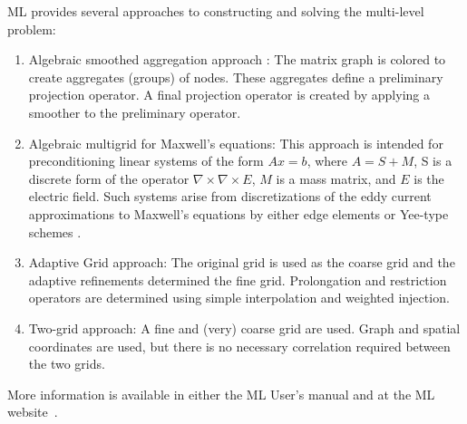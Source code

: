 \documentclass[12pt,relax]{TPA}
\begin{document}
ML provides several approaches to constructing and solving the multi-level
problem:
\begin{enumerate}
\item Algebraic smoothed aggregation approach \cite{Vanek:96,Vanek:98}:  The
 matrix graph is colored to create aggregates (groups) of nodes.
These aggregates define a preliminary projection operator.
A final projection operator is created by applying a smoother to the
 preliminary operator.
%
\item Algebraic multigrid for Maxwell's equations:
 This approach is
intended for preconditioning linear systems of the form $Ax=b$, where $A=S+M$,
S is a discrete form of the operator $\nabla\times\nabla\times E$,
 $M$ is a mass matrix, and $E$ is the electric field.
Such systems arise from discretizations of the eddy current approximations to
Maxwell's equations by either edge elements or Yee-type schemes
\cite{Bochev:03a,Yee:66}.


%
\item Adaptive Grid approach: The original grid is used as the coarse grid and
the adaptive refinements determined the fine grid.
Prolongation and restriction operators are determined using simple interpolation
and weighted injection.
%
\item Two-grid approach: A fine and (very) coarse grid are used.
Graph and spatial coordinates are used, 
but there is no necessary correlation required between the two grids.
\end{enumerate}

%
More information is available in either the ML User's manual
\cite{TuminaroTong:00a} and at the ML website~\cite{ML-home-page}.
\end{document}
